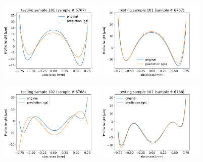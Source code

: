 \documentclass[]{article}
\begin{document}
  

\thispagestyle{empty}


\begin{figure}
\includegraphics[width=0.45\textwidth]{figures/v25p101.png}
\includegraphics[width=0.45\textwidth]{figures/v26p101.png}

\includegraphics[width=0.45\textwidth]{figures/v25p102.png}
\includegraphics[width=0.45\textwidth]{figures/v26p102.png}


\end{figure}
\end{document}
